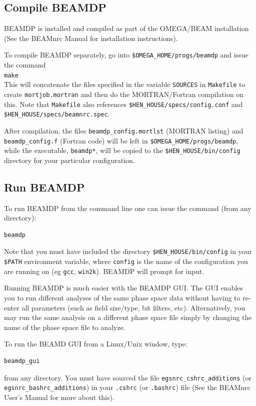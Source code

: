 \documentclass[12pt,twoside]{article}
\begin{document}
\subsection{Compile BEAMDP}

BEAMDP is installed and compiled as part of the OMEGA/BEAM installation
(See the BEAMnrc Manual\cite{Ro04a} for installation instructions).

To compile BEAMDP separately, go into
{\tt \$OMEGA\_HOME/progs/beamdp} and issue the command\\
{\tt make}\\
This will concatenate the files specified in the variable
{\tt SOURCES} in {\tt Makefile} to create {\tt mortjob.mortran}
and then do the MORTRAN/Fortran compilation on this.
Note that {\tt Makefile} also references {\tt \$HEN\_HOUSE/specs/config.conf}
and {\tt \$HEN\_HOUSE/specs/beamnrc.spec}.

After compilation, the files {\tt beamdp\_config.mortlst} (MORTRAN listing)
and {\tt beamdp\_config.f} (Fortran code) will be left in
{\tt \$OMEGA\_HOME/progs/beamdp}, while the executable, {\tt beamdp*}, will
be copied to the {\tt \$HEN\_HOUSE/bin/config} directory for your
particular configuration.

\subsection{Run BEAMDP}
To run BEAMDP from the command line one can issue the command
(from any directory):
\begin{verbatim}
beamdp
\end{verbatim}
Note that you must have included the directory
{\tt \$HEN\_HOUSE/bin/config} in your
{\tt \$PATH} environment variable, where {\tt config} is the name
of the configuration you are running on (eg {\tt gcc}, {\tt win2k}).
BEAMDP will prompt for input.

Running BEAMDP is much easier with the BEAMDP GUI\cite{Tr04}.  The GUI enables you
to run different analyses of the same phase space data without having to
re-enter all parameters (such as field size/type, bit filters, etc).
Alternatively, you may run the same analysis on a different phase space
file simply by changing the name of the phase space file to analyze.

To run the BEAMD GUI from a Linux/Unix window, type:
\begin{verbatim}
beamdp_gui
\end{verbatim}
from any directory.  You
must have sourced the file {\tt egsnrc\_cshrc\_additions} (or\\
{\tt egsnrc\_bashrc\_additions}) in your {\tt .cshrc} (or {\tt .bashrc})
file (See the BEAMnrc User's Manual\cite{Ro04a} for more about this).
\end{document}
